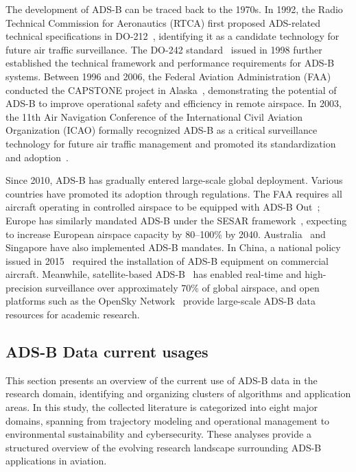 The development of ADS-B can be traced back to the 1970s. In 1992, the Radio Technical Commission for Aeronautics (RTCA) first proposed ADS-related technical specifications in DO-212~\cite{RCTA_DO-212}, identifying it as a candidate technology for future air traffic surveillance. The DO-242 standard~\cite{RCTA_DO-242} issued in 1998 further established the technical framework and performance requirements for ADS-B systems. Between 1996 and 2006, the Federal Aviation Administration (FAA) conducted the CAPSTONE project in Alaska~\cite{faa2000capstone}, demonstrating the potential of ADS-B to improve operational safety and efficiency in remote airspace. In 2003, the 11th Air Navigation Conference of the International Civil Aviation Organization (ICAO) formally recognized ADS-B as a critical surveillance technology for future air traffic management and promoted its standardization and adoption~\cite{icao_2003}.

Since 2010, ADS-B has gradually entered large-scale global deployment. Various countries have promoted its adoption through regulations. The FAA requires all aircraft operating in controlled airspace to be equipped with ADS-B Out~\cite{cfr91-225}; Europe has similarly mandated ADS-B under the SESAR framework~\cite{undertaking2009european}, expecting to increase European airspace capacity by 80–100\% by 2040. Australia~\cite{casa2010cao20-18} and Singapore have also implemented ADS-B mandates. In China, a national policy issued in 2015~\cite{caac2015adsb} required the installation of ADS-B equipment on commercial aircraft. Meanwhile, satellite-based ADS-B~\cite{melero2024satera} has enabled real-time and high-precision surveillance over approximately 70\% of global airspace, and open platforms such as the OpenSky Network~\cite{schafer2014bringing} provide large-scale ADS-B data resources for academic research.


\subsection{ADS-B Data current usages}

This section presents an overview of the current use of ADS-B data in the research domain, identifying and organizing clusters of algorithms and application areas. In this study, the collected literature is categorized into eight major domains, spanning from trajectory modeling and operational management to environmental sustainability and cybersecurity. These analyses provide a structured overview of the evolving research landscape surrounding ADS-B applications in aviation.

